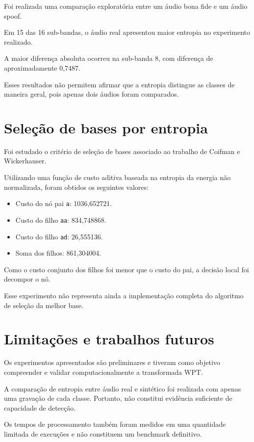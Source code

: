 \documentclass[12pt,a4paper]{article}
\begin{document}
Foi realizada uma comparação exploratória
entre um áudio bona fide e um áudio spoof.

Em 15 das 16 sub-bandas, o áudio real apresentou
maior entropia no experimento realizado.

A maior diferença absoluta ocorreu na sub-banda
8, com diferença de aproximadamente 0,7487.

Esses resultados não permitem afirmar que a
entropia distingue as classes de maneira geral,
pois apenas dois áudios foram comparados.

\section{Seleção de bases por entropia}

Foi estudado o critério de seleção de bases
associado ao trabalho de Coifman e Wickerhauser.

Utilizando uma função de custo aditiva baseada
na entropia da energia não normalizada, foram
obtidos os seguintes valores:

\begin{itemize}
\item Custo do nó pai \texttt{a}: 1036,652721.
\item Custo do filho \texttt{aa}: 834,748868.
\item Custo do filho \texttt{ad}: 26,555136.
\item Soma dos filhos: 861,304004.
\end{itemize}

Como o custo conjunto dos filhos foi menor
que o custo do pai, a decisão local foi
decompor o nó.

Esse experimento não representa ainda
a implementação completa do algoritmo
de seleção da melhor base.


\section{Limitações e trabalhos futuros}

Os experimentos apresentados são preliminares e tiveram
como objetivo compreender e validar computacionalmente
a transformada WPT.

A comparação de entropia entre áudio real e sintético foi
realizada com apenas uma gravação de cada classe. Portanto,
não constitui evidência suficiente de capacidade de detecção.

Os tempos de processamento também foram medidos em uma
quantidade limitada de execuções e não constituem um
benchmark definitivo.
\end{document}
